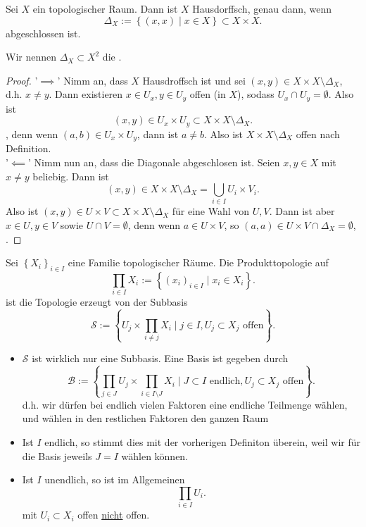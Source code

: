 \begin{theorem}[Diagonaleigenschaft]\label{thm:raum-ist-hausdorff-gdw-diagonale-abgeschlossen}
    Sei $X$ ein topologischer Raum. Dann ist  $X$ Hausdorffsch, genau dann, wenn
     \[
         \Delta_X := \left \{(x,x) \mid  x\in X\right\}  \subset X\times X
    .\] 
    abgeschlossen ist.
\end{theorem}
\begin{notation*}
    Wir nennen $\Delta_X\subset X^2$  die .
\end{notation*}
\begin{proof}
'$\implies$' Nimm an, dass $X$ Hausdroffsch ist und sei  $(x,y) \in X \times X \setminus \Delta_X$, d.h. $x\neq y$. Dann existieren $x\in U_x,y\in U_y$ offen (in $X$), sodass  $U_x \cap  U_y = \emptyset$. Also ist
    \[
        (x,y)\in     U_x\times U_y \subset X\times X \setminus \Delta_X
    .\] 
    , denn wenn $(a,b) \in U_x \times U_y$, dann ist $a\neq b$. Also ist  $X\times X \setminus \Delta_X$ offen nach Definition. \\
    '$\impliedby$'    Nimm nun an, dass die Diagonale abgeschlosen ist. Seien $x,y\in X$ mit $x\neq y$ beliebig. Dann ist
    \[
        (x,y) \in X\times X \setminus \Delta_X = \bigcup_{i\in I} U_i \times V_i 
    .\] 
    Also ist $(x,y) \in U\times V \subset X\times X\setminus \Delta_X$ für eine Wahl von $U,V$. Dann ist aber  $x\in U, y\in V$ sowie $U\cap V = \emptyset$, denn wenn $a\in U\times V$, so $(a,a) \in U\times V \cap  \Delta_X = \emptyset$, \contra.
\end{proof}
\begin{definition}\label{def:produkt-beliebiger-mengen}
    Sei $\left \{X_i\right\} _{i \in I}$ eine Familie topologischer Räume. Die Produkttopologie auf
    \[
        \prod_{i\in I} X_i := \left \{(x_i)_{i\in I} \mid  x_i \in X_i\right\} 
    .\] 
    ist die Topologie erzeugt von der Subbasis
    \[
    \mathcal{S}  := \left \{U_j \times  \prod_{i\neq j} X_i \mid  j\in I, U_j \subset X_j \text{ offen}\right\} 
    .\] 
\end{definition}
\begin{remark}
    \begin{itemize}
        \item 
    $\mathcal{S}$ ist wirklich nur eine Subbasis. Eine Basis ist gegeben durch
    \[
        \mathcal{B} := \left \{\prod_{j\in J} U_j \times \prod_{i\in I \setminus J} X_i \mid  J\subset I \text{ endlich}, U_j \subset X_j \text{ offen}\right\} 
    .\] 
    d.h. wir dürfen bei endlich vielen Faktoren eine endliche Teilmenge wählen, und wählen in den restlichen Faktoren den ganzen Raum
\item Ist $I$ endlich, so stimmt dies mit der vorherigen Definiton überein, weil wir für die Basis jeweils  $J = I$ wählen können.
\item \Warning Ist  $I$ unendlich, so ist im Allgemeinen
     \[
    \prod_{i\in I} U_i
    .\] 
    mit $U_i \subset X_i$ offen \underline{nicht} offen. 
    \end{itemize}
\end{remark}
